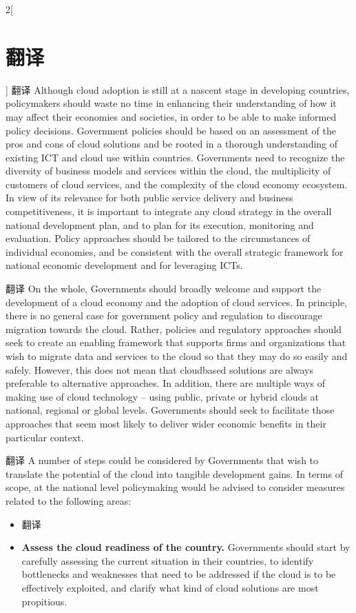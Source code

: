 \documentclass[a4paper, UTF8, 12pt]{article}
\begin{document}
\begin{paracol}{2}[\section{翻译}]
    \switchcolumn*
    翻译
    \switchcolumn
    Although cloud adoption is still at a nascent stage in developing countries, policymakers should waste no time in enhancing their understanding of how it may affect their economies and societies, in order to be able to make informed policy decisions. Government policies should be based on an assessment of the pros and cons of cloud solutions and be rooted in a thorough understanding of existing ICT and cloud use within countries. Governments need to recognize the diversity of business models and services within the cloud, the multiplicity of customers of cloud services, and the complexity of the cloud economy ecosystem. In view of its relevance for both public service delivery and business competitiveness, it is important to integrate any cloud strategy in the overall national development plan, and to plan for its execution, monitoring and evaluation. Policy approaches should be tailored to the circumstances of individual economies, and be consistent with the overall strategic framework for national economic development and for leveraging ICTs.

    \switchcolumn*
    翻译
    \switchcolumn
    On the whole, Governments should broadly welcome and support the development of a cloud economy and the adoption of cloud services. In principle, there is no general case for government policy and regulation to discourage migration towards the cloud. Rather, policies and regulatory approaches should seek to create an enabling framework that supports firms and organizations that wish to migrate data and services to the cloud so that they may do so easily and safely. However, this does not mean that cloudbased solutions are always preferable to alternative approaches. In addition, there are multiple ways of making use of cloud technology – using public, private or hybrid clouds at national, regional or global levels. Governments should seek to facilitate those approaches that seem most likely to deliver wider economic benefits in their particular context. 

    \switchcolumn*
    翻译
    \switchcolumn
    A number of steps could be considered by Governments that wish to translate the potential of the cloud into tangible development gains. In terms of scope, at the national level policymaking would be advised to consider measures related to the following areas:

    \begin{itemize}
        \switchcolumn*
        \item 翻译
        \switchcolumn
        \item {\bfseries Assess the cloud readiness of	the	country.} Governments should start by carefully assessing the current situation in their countries, to identify bottlenecks and weaknesses that need to be addressed if the cloud is to be effectively exploited, and clarify what kind of cloud solutions are most propitious.  
        

\end{itemize}
\end{paracol}
\end{document}
